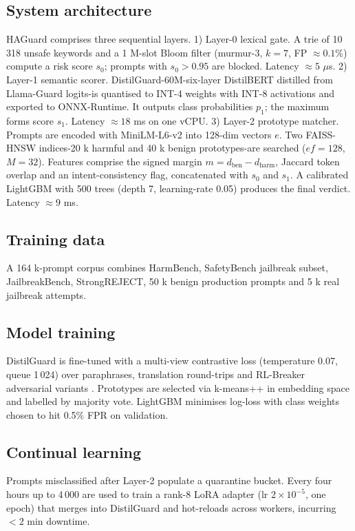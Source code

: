 \documentclass{article}
\begin{document}
\subsection{System architecture}
HAGuard comprises three sequential layers. 1) Layer-0 lexical gate. A trie of 10\,318 unsafe keywords and a 1 M-slot Bloom filter (murmur-3, $k = 7$, FP $\approx 0.1$\%) compute a risk score $s_0$; prompts with $s_0 > 0.95$ are blocked. Latency $\approx 5$ \(\mu\)s. 2) Layer-1 semantic scorer. DistilGuard-60M-six-layer DistilBERT distilled from Llama-Guard logits-is quantised to INT-4 weights with INT-8 activations and exported to ONNX-Runtime. It outputs class probabilities $p_1$; the maximum forms score $s_1$. Latency $\approx 18$ ms on one vCPU. 3) Layer-2 prototype matcher. Prompts are encoded with MiniLM-L6-v2 into 128-dim vectors $e$. Two FAISS-HNSW indices-20 k harmful and 40 k benign prototypes-are searched ($ef = 128$, $M = 32$). Features comprise the signed margin $m = d_{\text{ben}} - d_{\text{harm}}$, Jaccard token overlap and an intent-consistency flag, concatenated with $s_0$ and $s_1$. A calibrated LightGBM with 500 trees (depth 7, learning-rate 0.05) produces the final verdict. Latency $\approx 9$ ms.

\subsection{Training data}
A 164 k-prompt corpus combines HarmBench, SafetyBench jailbreak subset, JailbreakBench, StrongREJECT, 50 k benign production prompts and 5 k real jailbreak attempts.

\subsection{Model training}
DistilGuard is fine-tuned with a multi-view contrastive loss (temperature 0.07, queue 1\,024) over paraphrases, translation round-trips and RL-Breaker adversarial variants \cite{chen-2024-when}. Prototypes are selected via k-means++ in embedding space and labelled by majority vote. LightGBM minimises log-loss with class weights chosen to hit 0.5\% FPR on validation.

\subsection{Continual learning}
Prompts misclassified after Layer-2 populate a quarantine bucket. Every four hours up to 4\,000 are used to train a rank-8 LoRA adapter (lr $2 \times 10^{-5}$, one epoch) that merges into DistilGuard and hot-reloads across workers, incurring $< 2$ min downtime.
\end{document}
